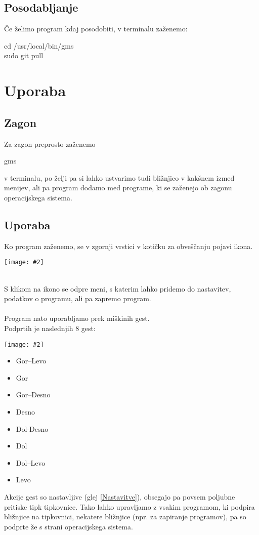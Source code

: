\documentclass[10pt,a4paper,oneside]{book}
\newcommand\inline[1]{%
\begin{Sbox}{#1}\end{Sbox}%
\colorbox{lightgray}{\TheSbox}%
}
\newcommand\inliney[1]{%
\begin{Sbox}\begin{varwidth}{0.91\textwidth}{#1}\end{varwidth}\end{Sbox}%
\colorbox{lightgray}{\TheSbox}%
}
\newcommand\pic[2]{%
\parbox{1cm}{%
\begin{center}%
\texttt{[image: \#2]}%
\end{center}%
}%
}
\newcommand\br{%
 \ \\ \ \\%
}
\begin{document}
\subsection{Posodabljanje}
Če želimo program kdaj posodobiti, v terminalu zaženemo:\\
\inliney{cd /usr/local/bin/gms\\
sudo git pull}
\section{Uporaba}
\subsection{Zagon}
Za zagon preprosto zaženemo \inline{gms} v terminalu, po želji pa si lahko ustvarimo tudi bližnjico v kakšnem izmed menijev, ali pa program dodamo med programe, ki se zaženejo ob zagonu operacijskega sistema.

\subsection{Uporaba}
Ko program zaženemo, se v zgornji vrstici v kotičku za obveščanju pojavi ikona.\\
\pic{0.9}{./gmsAppindicator.png}\\
S klikom na ikono se odpre meni, s katerim lahko pridemo do nastavitev, podatkov o programu, ali pa zapremo program.
\br
Program nato uporabljamo prek miškinih gest.\\
Podprtih je naslednjih 8 gest:\\
\pic{0.2}{./gmsGestures.png}
\begin{itemize}
\item Gor--Levo
\item Gor
\item Gor--Desno
\item Desno
\item Dol-Desno
\item Dol
\item Dol--Levo
\item Levo
\end{itemize}
Akcije gest so nastavljive (glej \ref{Nastavitve}), obsegajo pa povsem poljubne pritiske tipk tipkovnice. Tako lahko upravljamo z vsakim programom, ki podpira bližnjice na tipkovnici, nekatere bližnjice (npr. za zapiranje programov), pa so podprte že s strani operacijskega sistema.
\newpage
\end{document}
